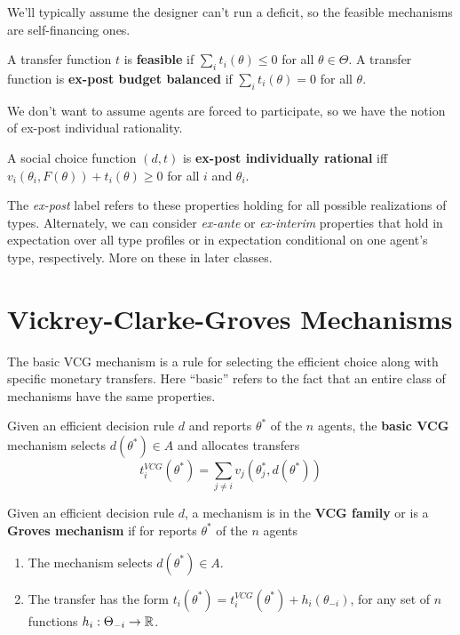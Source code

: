 \documentclass[10pt]{article}
\begin{document}
\begin{spacing}{1.0}
We'll typically assume the designer can't run a deficit, so the feasible
mechanisms are self-financing ones.

\begin{definition}
  A transfer function $t$ is \textbf{feasible} if $\sum_i t_i(\theta) \leq
  0$ for all $\theta \in \Theta$. A transfer function is \textbf{ex-post
    budget balanced} if $\sum_i t_i(\theta) = 0$ for all $\theta$.
\end{definition}

We don't want to assume agents are forced to participate, so we have the
notion of ex-post individual rationality.

\begin{definition}
  A social choice function $(d,t)$ is \textbf{ex-post
    individually rational} iff $v_i(\theta_i,F(\theta))+
  t_i(\theta) \geq 0$ for all $i$ and $\theta_i$.
\end{definition}

The \textit{ex-post} label refers to these properties holding for all
possible realizations of types. Alternately, we can consider
\textit{ex-ante} or \textit{ex-interim} properties that hold in expectation
over all type profiles or in expectation conditional on one agent's type,
respectively. More on these in later classes.

\section{Vickrey-Clarke-Groves Mechanisms}
\label{sec:vickr-clarke-grov}

The basic VCG mechanism is a rule for selecting the efficient choice along
with specific monetary transfers. Here ``basic'' refers to the fact that an
entire class of mechanisms have the same properties.

\begin{definition}
  Given an efficient decision rule $d$ and reports $\theta^*$ of the $n$
  agents, the \textbf{basic VCG} mechanism selects $d(\theta^*)\in A$ and
  allocates transfers \[t_i^{VCG}(\theta^*)=\sum_{j\neq i}
  v_j(\theta_j^*,d(\theta^*))\]
\end{definition}

\begin{definition}
  Given an efficient decision rule $d$, a mechanism is in the \textbf{VCG
    family} or is a \textbf{Groves mechanism} if for reports $\theta^*$ of
  the $n$ agents
  \begin{enumerate}
  \item The mechanism selects $d(\theta^*) \in A$.
  \item The transfer has the form $t_i(\theta^*) = t_i^{VCG}(\theta^*)
    + h_i(\theta_{-i})$, for any set of $n$
    functions $h_i:\Theta_{-i} \to \mathbb{R}$.
  \end{enumerate}
\end{definition}


\end{spacing}
\end{document}
